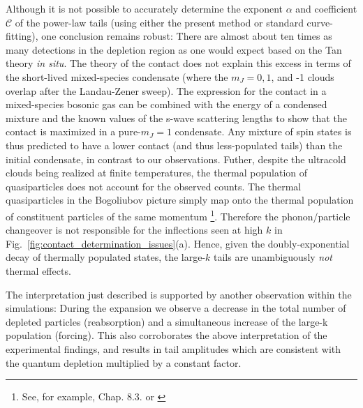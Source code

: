 {	Although it is not possible to accurately determine the  exponent $\alpha$ and coefficient $\mathcal{C}$ of the power-law tails (using either the present method or standard curve-fitting), one conclusion remains robust: There are {almost} about ten times as many detections in the depletion region as one would expect based on the Tan theory {\emph{in situ}}. 
	The theory of the contact does not explain this excess in terms of the short-lived mixed-species condensate (where the $m_J=0,1$, and -1 clouds overlap after the Landau-Zener sweep). 
	The expression for the contact in a mixed-species bosonic gas \cite{Werner12_boson} can be combined with the energy of a condensed mixture \cite{PethickSmith} and the known values of the s-wave scattering lengths \cite{Vassen16} to show that the contact is maximized in a pure-$m_J=1$ condensate.
	Any mixture of spin states is thus predicted to have a lower contact (and thus less-populated tails) than the initial condensate, in contrast to our observations.
	Futher, despite the ultracold clouds being realized at finite temperatures, the thermal population of quasiparticles does not account for the observed counts. 
	The thermal quasiparticles in the Bogoliubov picture simply map onto the thermal population of constituent particles of the same momentum \footnote{See, for example, \cite{PethickSmith} Chap. 8.3. or \cite{Vogels02}}. 
	{Therefore the phonon/particle changeover is not responsible for the inflections seen at high $k$ in Fig.~\ref{fig:contact_determination_issues}(a).} 
	Hence, given the doubly-exponential decay of thermally populated states, the large-$k$ tails are unambiguously \emph{not} thermal effects. 
	
	
	The interpretation just described is supported by another observation within the simulations:
	During the expansion we observe a decrease in the total number of depleted particles (reabsorption) and a simultaneous increase of the large-k population (forcing). 
	This {also corroborates the above interpretation} %
	of the experimental findings, and results in tail amplitudes which are consistent with the quantum depletion multiplied by a constant factor. 
	
}
